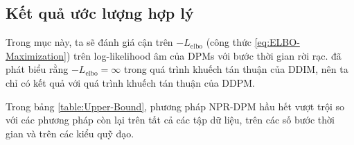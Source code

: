\documentclass[14pt, a4paper]{article}
\numberwithin{equation}{section}
\numberwithin{figure}{section}
\numberwithin{dl}{section}
\numberwithin{md}{section}
\numberwithin{bd}{section}
\numberwithin{dn}{section}
\numberwithin{hq}{section}
\begin{document}
    \subsection{Kết quả ước lượng hợp lý}

    Trong mục này, ta sẽ đánh giá cận trên $-L_{\mathrm{elbo}}$ (công thức \ref{eq:ELBO-Maximization}) trên log-likelihood âm của DPMs với bước thời gian rời rạc.
    \cite{bao2021analytic} đã phát biểu rằng $-L_{\mathrm{elbo}}=\infty$ trong quá trình khuếch tán thuận của DDIM, nên ta chỉ có kết quả với quá trình khuếch tán thuận của DDPM.

    Trong bảng \ref{table:Upper-Bound}, phương pháp NPR-DPM hầu hết vượt trội so với các phương pháp còn lại trên tất cả các tập dữ liệu, trên các số bước thời gian và trên các kiểu quỹ đạo.

    \begin{table}[h!]
        \caption{Số bước nhỏ nhất để đạt được khoảng cách FID khoảng bằng 6.
        Chi phí thời gian trong từng bước cho từng phương pháp xem như là như nhau.
        Phương pháp của ta có thêm mạng dự đoán phần dư nhiễu NPR hoặc mạng dự đoán bình phương nhiễu SN vì vậy sẽ tăng thêm chi phí thời gian.
        Ta nhân kết quả với tỷ lệ chi phí thời gian trên từng bước so với các phương pháp được so sánh}
        \begin{center}
        \end{center}
        \label{table:Smallest-steps-to-achieved-FID-6}
    \end{table}
\end{document}
